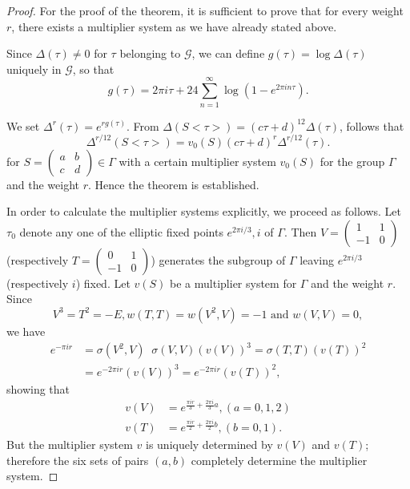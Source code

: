 \begin{proof}
For the proof of the theorem, it is sufficient to prove that for every
weight $r$, there exists a multiplier system as we have already stated
above.

Since $\Delta(\tau)\neq 0$ for $\tau$ belonging to $\mathscr{G}$, we
can define $g(\tau)=\log \Delta(\tau)$ uniquely in $\mathscr{G}$, so
that 
$$
g(\tau) = 2\pi i \tau+24 \sum^{\infty}_{n=1} \log (1-e^{2\pi i
  n\tau}).
$$

We set $\Delta^r(\tau)=e^{rg(\tau)}$. From $\Delta(S<\tau>) =
(c\tau+d)^{12}\Delta(\tau)$, follows that 
$$
\Delta^{r/12} (S<\tau>) = v_0 (S)(c\tau+d)^r\Delta^{r/12}(\tau).
$$
for $S = \left(\begin{smallmatrix}
  a&b\\c&d \end{smallmatrix}\right)\in \Gamma$ with a certain
multiplier system $v_0(S)$ for the group $\Gamma$ and the weight
$r$. Hence the theorem is established.

In order to calculate the multiplier systems explicitly, we proceed as
follows. Let $\tau_0$ denote any one of the elliptic fixed points
$e^{2\pi i/3}, i$ of $\Gamma$. Then
$V=\left(\begin{smallmatrix} 1&1\\-1&0 \end{smallmatrix}\right)$
(respectively $T=\left(\begin{smallmatrix}
  0&1\\-1&0 \end{smallmatrix}\right)$) generates the subgroup of
$\Gamma$ leaving $e^{2\pi i /3}$ (respectively $i$) fixed. Let $v(S)$
be a multiplier system for $\Gamma$ and the weight $r$. Since 
$$
V^3 = T^2=-E, w(T,T) = w(V^2,V) =-1 \text{ and } w(V,V)=0,
$$
we have
\begin{align*}
e^{-\pi ir}& = \sigma(V^2,V) \;\; \sigma(V,V)(v(V))^3 =
\sigma(T,T)(v(T))^2\\
& = e^{-2 \pi i r} (v(V))^3 = e^{-2\pi ir} (v(T))^2,
\end{align*}\pageoriginale
showing that 
\begin{align*}
v(V) & = e^{\frac{\pi ir}{3}+\frac{2\pi i}{3}a}, (a=0,1,2)\\
v(T) & = e^{\frac{\pi i r}{2}+\frac{2\pi i}{2}b}, (b=0,1). 
\end{align*}
But the multiplier system $v$ is uniquely determined by $v(V)$ and
$v(T)$; therefore the six sets of pairs $(a,b)$ completely determine
the multiplier system.


\end{proof}
